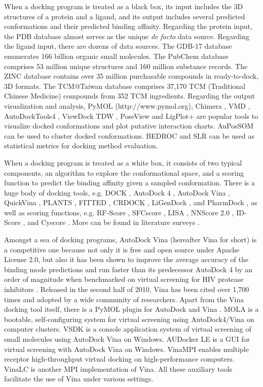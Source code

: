 When a docking program is treated as a black box, its input includes the 3D structures of a protein and a ligand, and its output includes several predicted conformations and their predicted binding affinity. Regarding the protein input, the PDB database \citep{539,537} almost serves as the unique \textit{de facto} data source. Regarding the ligand input, there are dozens of data sources. The GDB-17 database \citep{1276} enumerates 166 billion organic small molecules. The PubChem database \citep{526} comprises 53 million unique structures and 160 million substance records. The ZINC database \citep{532,1178} contains over 35 million purchasable compounds in ready-to-dock, 3D formats. The TCM@Taiwan database \citep{528} comprises 37,170 TCM (Traditional Chinese Medicine) compounds from 352 TCM ingredients. Regarding the output visualization and analysis, PyMOL (http://www.pymol.org), Chimera \citep{1219}, VMD \citep{1220}, AutoDockTools4 \citep{596}, ViewDock TDW \citep{559}, PoseView \citep{748} and LigPlot+ \citep{951} are popular tools to visualize docked conformations and plot putative interaction charts. AuPosSOM \citep{598} can be used to cluster docked conformations. BEDROC \citep{490} and SLR \citep{489} can be used as statistical metrics for docking method evaluation.

When a docking program is treated as a white box, it consists of two typical components, an algorithm to explore the conformational space, and a scoring function to predict the binding affinity given a sampled conformation. There is a huge body of docking tools, e.g. DOCK \citep{1222,1445}, AutoDock 4 \citep{596}, AutoDock Vina \citep{595}, QuickVina \citep{1193}, PLANTS \citep{610,607,779}, FITTED \citep{602,603}, CRDOCK \citep{1200}, LiGenDock \citep{1495}, and PharmDock \citep{1376}, as well as scoring functions, e.g. RF-Score \citep{564,1370}, SFCscore \citep{581,1347}, LISA \citep{775}, NNScore 2.0 \citep{977}, ID-Score \cite{1305}, and Cyscore \cite{1372}. More can be found in literature surveys \citep{493,922}.

Amongst a sea of docking programs, AutoDock Vina \citep{595} (hereafter Vina for short) is a competitive one because not only it is free and open source under Apache License 2.0, but also it has been shown to improve the average accuracy of the binding mode predictions \citep{595} and run faster than its predecessor AutoDock 4 \citep{596} by an order of magnitude when benchmarked on virtual screening for HIV protease inhibitors \citep{556}. Released in the second half of 2010, Vina has been cited over 1,700 times and adopted by a wide community of researchers. Apart from the Vina docking tool itself, there is a PyMOL plugin for AutoDock and Vina \citep{609}. MOLA \citep{773} is a bootable, self-configuring system for virtual screening using AutoDock4/Vina on computer clusters. VSDK \citep{1268} is a console application system of virtual screening of small molecules using AutoDock Vina on Windows. AUDocker LE \citep{1250} is a GUI for virtual screening with AutoDock Vina on Windows. VinaMPI \citep{1329} enables multiple receptor high-throughput virtual docking on high-performance computers. VinaLC \citep{1562} is another MPI implementation of Vina. All these auxiliary tools facilitate the use of Vina under various settings.

